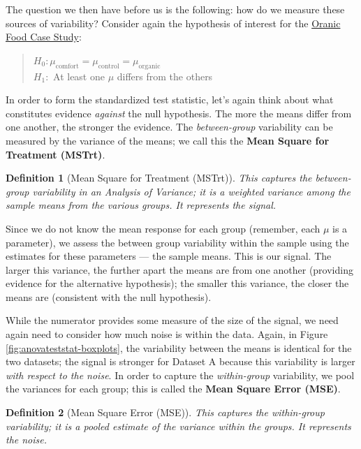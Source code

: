 \documentclass[
]{book}
\theoremstyle{plain}
\theoremstyle{mydefn}
\newtheorem{definition}{Definition}[chapter]
\theoremstyle{myexmpl}
\theoremstyle{remark}
\begin{document}
The question we then have before us is the following: how do we measure these sources of variability? Consider again the hypothesis of interest for the \protect\hyperlink{CaseOrganic}{Oranic Food Case Study}:

\begin{quote}
\(H_0: \mu_{\text{comfort}} = \mu_{\text{control}} = \mu_{\text{organic}}\)\\
\(H_1:\) At least one \(\mu\) differs from the others
\end{quote}

In order to form the standardized test statistic, let's again think about what constitutes evidence \emph{against} the null hypothesis. The more the means differ from one another, the stronger the evidence. The \emph{between-group} variability can be measured by the variance of the means; we call this the \textbf{Mean Square for Treatment (MSTrt)}.

\begin{definition}[Mean Square for Treatment (MSTrt)]
\protect\hypertarget{def:defn-mstrt}{}{\label{def:defn-mstrt} {} }This captures the between-group variability in an Analysis of Variance; it is a weighted variance among the sample means from the various groups. It represents the signal.
\end{definition}

Since we do not know the mean response for each group (remember, each \(\mu\) is a parameter), we assess the between group variability within the sample using the estimates for these parameters --- the sample means. This is our signal. The larger this variance, the further apart the means are from one another (providing evidence for the alternative hypothesis); the smaller this variance, the closer the means are (consistent with the null hypothesis).

While the numerator provides some measure of the size of the signal, we need again need to consider how much noise is within the data. Again, in Figure \ref{fig:anovateststat-boxplots}, the variability between the means is identical for the two datasets; the signal is stronger for Dataset A because this variability is larger \emph{with respect to the noise}. In order to capture the \emph{within-group} variability, we pool the variances for each group; this is called the \textbf{Mean Square Error (MSE)}.

\begin{definition}[Mean Square Error (MSE)]
\protect\hypertarget{def:defn-mse-alt}{}{\label{def:defn-mse-alt} {} }This captures the within-group variability; it is a pooled estimate of the variance within the groups. It represents the noise.
\end{definition}
\end{document}
